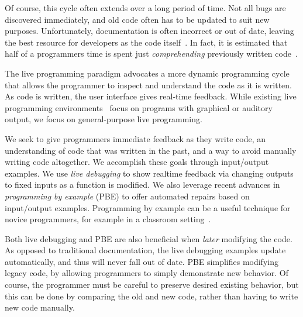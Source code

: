 Of course, this cycle often extends over a long period of time.
Not all bugs are discovered immediately,
and old code often has to be updated to suit new purposes.
Unfortunately, documentation is often incorrect or out of date,
leaving the best resource for developers as the code itself~\cite{latoza2006maintaining}.
In fact, it is estimated that half of a programmers time
is spent just \textit{comprehending} previously written code~\cite{corbi1989program}.

The live programming paradigm advocates a more dynamic programming cycle that allows the programmer to inspect and understand the code as it is written. As code is written, the user interface gives real-time feedback.  While existing live programming environments~\cite{victor2012, chugh2016programmatic, brown2009interacting} focus on programs with graphical or auditory output, we focus on general-purpose live programming.

We seek to give programmers immediate feedback as they write code,
an understanding of code that was written in the past, 
and a way to avoid manually writing code altogether.
We accomplish these goals through input/output examples.
We use \textit{live debugging} to show realtime feedback via changing outputs to fixed inputs as a function is modified.
We also leverage recent advances in \textit{programming by example} (PBE) to offer automated repairs based on input/output examples.
Programming by example can be a useful technique for novice programmers, for example in a classroom setting~\cite{Suzuki2017}.

Both live debugging and PBE are also beneficial when \textit{later} modifying the code.
As opposed to traditional documentation, the live debugging examples update automatically, and thus will never fall out of date.
PBE simplifies modifying legacy code, by allowing programmers to simply demonstrate new behavior.
Of course, the programmer must be careful to preserve desired existing behavior,
but this can be done by comparing the old and new code,
rather than having to write new code manually.


